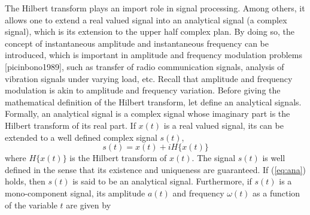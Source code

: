 \documentclass[../Main/thesis.tex]{subfiles}
\begin{document}
The Hilbert transform plays an import role in signal processing. Among others, it allows one to extend a real valued signal into an analytical signal (a complex signal), which is its extension to the upper half complex plan. By doing so, the concept of instantaneous amplitude and instantaneous frequency can be introduced, which is important in amplitude and frequency modulation problems [picinbono1989], such as transfer of radio communication signals, analysis of vibration signals under varying load, etc. Recall that amplitude and frequency modulation is akin to amplitude and frequency variation.
 Before giving the mathematical definition of the Hilbert transform, let define an analytical signals.
 Formally, an analytical signal is a complex signal whose imaginary part is the Hilbert transform of its real part. If $x(t)$ is a real valued signal, its can be extended to a well defined complex signal $s(t)$, 
 \begin{equation}\label{eq:ana}
 	s(t) = x(t) + i H\{ x(t)\}
 \end{equation}
where $H\{ x(t)\}$ is the Hilbert transform of $x(t)$. The signal $s(t)$ is well defined in the sense that its existence and uniqueness are guaranteed. If (\ref{eq:ana}) holds, then $s(t)$ is said to be an analytical signal. Furthermore, if $s(t)$ is a mono-component signal, its amplitude $a(t)$ and frequency $\omega(t)$ as a function of the variable $t$ are given by

\end{document}
